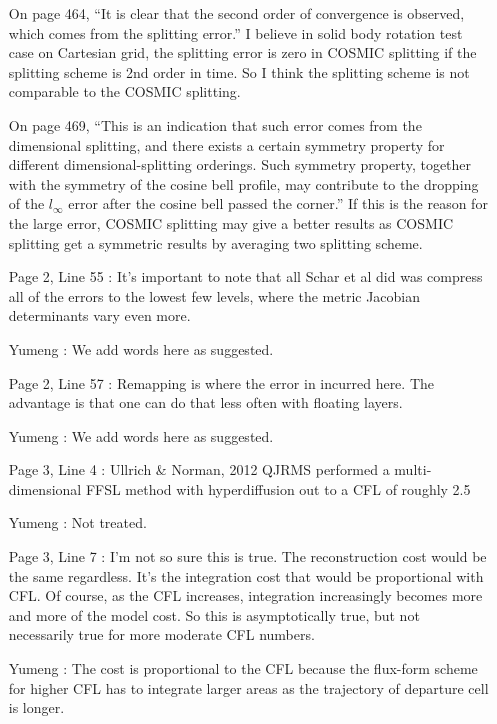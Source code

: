 \documentclass[12pt]{article}
\begin{document}
\begin{enumerate}
On page 464, ``It is clear that the second order of convergence is observed, which comes from the splitting error.''
I believe in solid body rotation test case on Cartesian grid, the splitting error is zero in COSMIC splitting if the splitting scheme is 2nd order in time. So I think the splitting scheme is not comparable to the COSMIC splitting.

On page 469, ``This is an indication that such error comes from the dimensional splitting, and there exists a certain symmetry property for different dimensional-splitting orderings. Such symmetry property, together with the symmetry of the cosine bell profile, may contribute to the dropping of the $l_\infty$ error after the cosine bell passed the corner.''
If this is the reason for the large error, COSMIC splitting may give a better results as COSMIC splitting get a symmetric results by averaging two splitting scheme.

\item [Page 2, Line 55]: It's important to note that all Schar et al did was compress all of the errors to the lowest few levels, where the metric Jacobian determinants vary even more.

\item [Yumeng]: We add words here as suggested.

\item [Page 2, Line 57]: Remapping is where the error in incurred here. The advantage is that one can do that less often with floating layers.

\item [Yumeng]: We add words here as suggested.

\item [Page 3, Line 4]: Ullrich \& Norman, 2012 QJRMS performed a multi-dimensional FFSL method with hyperdiffusion out to a CFL of roughly 2.5

\item [Yumeng]: Not treated.

\item [Page 3, Line 7]: I'm not so sure this is true. The reconstruction cost would be the same regardless. It's the integration cost that would be proportional with CFL. Of course, as the CFL increases, integration increasingly becomes more and more of the model cost. So this is asymptotically true, but not necessarily true for more moderate CFL numbers.

\item [Yumeng]: The cost is proportional to the CFL because the flux-form scheme for higher CFL has to integrate larger areas as the trajectory of departure cell is longer.   


\end{enumerate}
\end{document}
